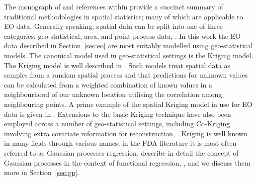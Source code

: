 The monograph of \cite{cressie_statistics_2015} and references within provide a succinct summary of traditional methodologies in spatial statistics; many of which are applicable to EO data.
Generally speaking, spatial data can be split into one of three categories; geo-statistical, area, and point process data, \citep{cressie_statistics_2015}.
In this work the EO data described in Section~\ref{sec:eo}  are most suitably modelled using geo-statistical models.
The canonical model used in geo-statistical settings is the Kriging model.
The Kriging model is well described in \cite{stein_interpolation_1999}.
Such models treat spatial data as samples from a random spatial process and that predictions for unknown values can be calculated from a weighted combination of known values in a neighbourhood of our unknown location utilising the correlation among neighbouring points.
A prime example of the spatial Kriging model in use for EO data is given in \cite{rossi_kriging_1994}.
Extensions to the basic Kriging technique have also been employed across a number of geo-statistical settings, including Co-Kriging involving extra covariate information for reconstruction, \cite{zhang_restoration_2009}.
Kriging is well known in many fields through various names, in the FDA literature it is most often referred to as Gaussian processes regression.
\citeauthor{shi_gaussian_2011} describe in detail the concept of Gaussian processes in the context of functional regression, \citep{shi_gaussian_2011}, and we discuss them more in Section~\ref{sec:gp}. 

